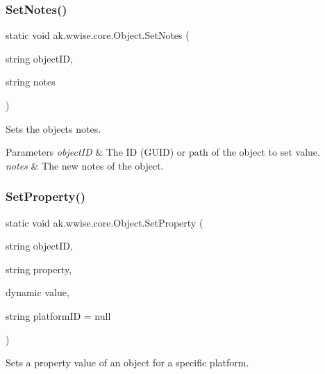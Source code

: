 \subsubsection{\texorpdfstring{Set\+Notes()}{SetNotes()}}
{\footnotesize\ttfamily static void ak.\+wwise.\+core.\+Object.\+Set\+Notes (\begin{DoxyParamCaption}\item[{string}]{object\+ID,  }\item[{string}]{notes }\end{DoxyParamCaption})\hspace{0.3cm}{\ttfamily [static]}}



Sets the object\textquotesingle{}s notes. 


\begin{DoxyParams}{Parameters}
{\em object\+ID} & The ID (G\+U\+ID) or path of the object to set value.\\
\hline
{\em notes} & The new notes of the object.\\
\hline
\end{DoxyParams}
\mbox{\label{classak_1_1wwise_1_1core_1_1_object_a485460b1349b05ddb80eee242a9f63ea}} 
\subsubsection{\texorpdfstring{Set\+Property()}{SetProperty()}}
{\footnotesize\ttfamily static void ak.\+wwise.\+core.\+Object.\+Set\+Property (\begin{DoxyParamCaption}\item[{string}]{object\+ID,  }\item[{string}]{property,  }\item[{dynamic}]{value,  }\item[{string}]{platform\+ID = {\ttfamily null} }\end{DoxyParamCaption})\hspace{0.3cm}{\ttfamily [static]}}



Sets a property value of an object for a specific platform. 


